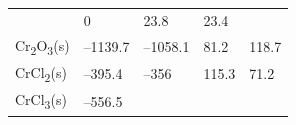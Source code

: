 \documentclass[
  9pt,
]{extbook}
\theoremstyle{definition}
\theoremstyle{definition}
\theoremstyle{definition}
\theoremstyle{remark}
\begin{document}
\begin{longtable}[]{@{}lllll@{}}
\begin{minipage}[t]{0.19\columnwidth}
\end{minipage} & \begin{minipage}[t]{0.20\columnwidth}\raggedright
0\strut
\end{minipage} & \begin{minipage}[t]{0.18\columnwidth}\raggedright
23.8\strut
\end{minipage} & \begin{minipage}[t]{0.18\columnwidth}\raggedright
23.4\strut
\end{minipage}\tabularnewline
\begin{minipage}[t]{0.10\columnwidth}\raggedright
Cr\textsubscript{2}O\textsubscript{3}(s)\strut
\end{minipage} & \begin{minipage}[t]{0.19\columnwidth}\raggedright
--1139.7\strut
\end{minipage} & \begin{minipage}[t]{0.20\columnwidth}\raggedright
--1058.1\strut
\end{minipage} & \begin{minipage}[t]{0.18\columnwidth}\raggedright
81.2\strut
\end{minipage} & \begin{minipage}[t]{0.18\columnwidth}\raggedright
118.7\strut
\end{minipage}\tabularnewline
\begin{minipage}[t]{0.10\columnwidth}\raggedright
CrCl\textsubscript{2}(s)\strut
\end{minipage} & \begin{minipage}[t]{0.19\columnwidth}\raggedright
--395.4\strut
\end{minipage} & \begin{minipage}[t]{0.20\columnwidth}\raggedright
--356\strut
\end{minipage} & \begin{minipage}[t]{0.18\columnwidth}\raggedright
115.3\strut
\end{minipage} & \begin{minipage}[t]{0.18\columnwidth}\raggedright
71.2\strut
\end{minipage}\tabularnewline
\begin{minipage}[t]{0.10\columnwidth}\raggedright
CrCl\textsubscript{3}(s)\strut
\end{minipage} & \begin{minipage}[t]{0.19\columnwidth}\raggedright
--556.5\strut
\end{minipage} & \begin{minipage}[t]{0.20\columnwidth}\raggedright

\end{minipage}
\end{longtable}
\end{document}
